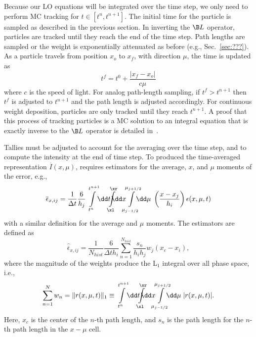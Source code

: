 Because our LO equations will be integrated over the time step, we only need to
perform MC tracking for $t\in[t^{n},t^{n+1}]$.  
The initial time for the particle is
sampled as described in the previous section. In inverting the $\B L$ operator, particles
are tracked until they reach the end of the time step.  Path lengths are sampled or the
weight is exponentially attenuated as before (e.g., Sec.~\ref{sec:???}).  As a particle
travels from position $x_{o}$ to $x_{f}$, with direction $\mu$, the time is updated as 
\begin{equation}
    t^{f} = t^{0} + \frac{|x_{f} - x_{o}|}{c \mu}
\end{equation}
where $c$ is the speed of light. For analog path-length sampling, if $t^{f}>t^{n+1}$ then $t^{f}$ is adjusted to $t^{n+1}$
and the path length is adjusted accordingly.  For continuous weight deposition, particles
are only tracked until they reach $t^{n+1}$.  A proof that this process of tracking
particles is a MC solution to an integral equation that is exactly inverse to the $\B L$ operator is
detailed in~\cite{cj_thesis,shultis_paper_cj_cites???}.  

Tallies must be adjusted to account for the averaging over the time step, and to compute the
intensity at the end of time step.  To produced the time-averaged representation
$\overline I(x,\mu)$, requires estimators for the average, $x$, and $\mu$ moments of the
error, e.g.,
\begin{equation}
    \overline\epsilon_{x,ij} = \frac{1}{\Delta t} \frac{6}{h_j}
    \int\limits_{t^{n}}^{t^{n+1}} \!\!\dd t \!\!\!
    \int\limits_{\xl}^{\xr} \!\!\!\!\! \dd x
    \hspace{-0.081in}\int\limits_{\mu_{j-1/2}}^{\mu_{j+1/2}} \hspace{-0.107in} \dd \mu
    \;\left(\frac{x - x_j}{h_{i}}\right) \epsilon(x,\mu,t)
\end{equation}
with a similar definition for the average and $\mu$ moments.  The estimators are defined
as
\begin{equation}
    \hat{\overline \epsilon}_{x,ij} =\frac{1}{N_{hist}} \frac{6}{\Delta t h_i} \sum_{n=1}^{N_{hist}}
    \frac{s_n}{h_{i}h_{j}} w_j \left(x_c - x_i\right),
\end{equation}
where the magnitude of the weights produce the L$_1$ integral over all phase space, i.e.,
\begin{equation}
\sum\limits_{n=1}^{N} w_n = \| r(x,\mu,t) \|_1 \equiv 
    \int\limits_{t^{n}}^{t^{n+1}} \!\!\dd t \!\!\!
    \int\limits_{\xl}^{\xr} \!\!\!\!\! \dd x
    \hspace{-0.081in}\int\limits_{\mu_{j-1/2}}^{\mu_{j+1/2}} \!\!\!\!\dd \mu\;
    |r(x,\mu,t)|.
\end{equation}
Here, $x_c$ is the center of the $n$-th
path length, and $s_{n}$ is the path length for the $n$-th path length in the $x-\mu$ cell.

